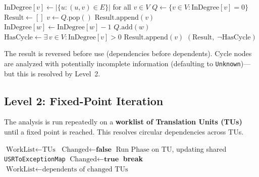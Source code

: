 \documentclass[11pt]{article}
\begin{document}
\begin{algorithm}[H]
\caption{Best-Effort Topological Sort}
\begin{algorithmic}[1]
    \State $\text{InDegree}[v] \gets |\{u : (u, v) \in E\}|$ for all $v \in V$
    \State $Q \gets \{v \in V : \text{InDegree}[v] = 0\}$
    \State $\text{Result} \gets []$
        \State $v \gets Q.\text{pop}()$
        \State $\text{Result}.\text{append}(v)$
            \State $\text{InDegree}[w] \gets \text{InDegree}[w] - 1$
                \State $Q.\text{add}(w)$
            \EndIf
        \EndFor
    \EndWhile
    \State $\text{HasCycle} \gets \exists\, v \in V : \text{InDegree}[v] > 0$
     
        \State $\text{Result}.\text{append}(v)$
    \EndFor
    \State \Return $(\text{Result},\; \neg\text{HasCycle})$
\EndProcedure
\end{algorithmic}
\end{algorithm}

The result is reversed before use (dependencies before dependents). Cycle nodes are analyzed with potentially incomplete information (defaulting to \texttt{Unknown})---but this is resolved by Level~2.

\subsection{Level 2: Fixed-Point Iteration}

The analysis is run repeatedly on a \textbf{worklist of Translation Units (TUs)} until a fixed point is reached. This resolves circular dependencies across TUs.

\begin{algorithm}[H]
\caption{Fixed-Point Analysis}
\begin{algorithmic}[1]
    \State $\text{WorkList} \gets \text{TUs}$ 
        \State $\text{Changed} \gets \textbf{false}$
            \State Run $\text{Phase}$ on $\text{TU}$, updating shared \texttt{USRToExceptionMap}
                \State $\text{Changed} \gets \textbf{true}$
            \EndIf
        \EndFor
            \State \textbf{break}
        \EndIf
        \State $\text{WorkList} \gets \text{dependents of changed TUs}$
    \EndWhile
\EndProcedure
\end{algorithmic}
\end{algorithm}
\end{document}

